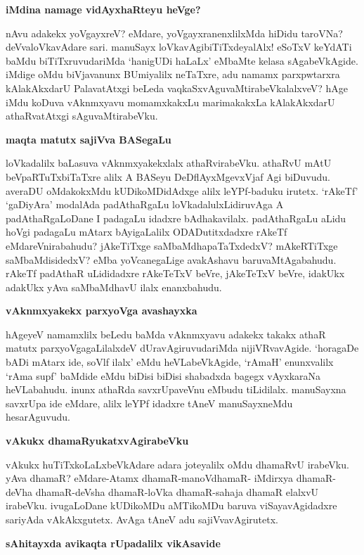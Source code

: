 {\bigskip
\noindent
{\large\bf iMdina namage vidAyxhaRteyu heVge?}}\label{page109}
\medskip

\noindent
nAvu adakekx yoVgayxreV? eMdare, yoVgayxranenxlilxMda hiDidu taroVNa? 
deVvaloVkavAdare sari. manuSayx loVkavAgibiTiTxdeyalAlx! eSoTxV keYdATi baMdu biTiTxruvudariMda `hanigUDi haLaLx' eMbaMte kelasa sAgabeVkAgide. iMdige oMdu biVjavanunx BUmiyalilx neTaTxre, adu namamx parxpwtarxra kAlakAkx\-darU PalavatAtxgi beLeda vaqkaSxvAguvaMtirabeVkalalxveV? hAge iMdu koDuva vAknmxyavu momamxkakxLu mari\-makakxLa kAlakAkxdarU athaRvatAtxgi sAguvaMtirabeVku.

{\bigskip
\noindent
{\large\bf maqta matutx sajiVva BASegaLu}}\label{page109}
\medskip

\noindent
loVkadalilx baLasuva vAknmxyakekxlalx athaRvirabeVku. athaRvU mAtU 
beVpaRTuTxbiTaTxre alilx A BASeyu DeDflAyxMgevxVjaf Agi biDuvudu. 
averaDU oMdakokxMdu kUDikoMDidAdxge alilx leYPf-\-baduku irutetx. `rAkeTf' `gaDiyAra' modalAda padAthaRgaLu loVkadalulxLidiruvAga A padAthaR\-gaLoDane I pada\-gaLu idadxre bAdhakavilalx. padAthaRgaLu aLidu hoVgi padagaLu mAtarx bAyigaLalilx ODADutitxdadxre rAkeTf eMdareVnirabahudu? jAkeTiTxge saMbaMdhapaTaTxdedxV? mAkeRTiTxge saMbaMdisidedxV? eMba yoVcanegaLige avakAshavu baruvaMtAgabahudu. rAkeTf padAthaR uLididadxre rAkeTeTxV beVre, jAkeTeTxV beVre, idakUkx adakUkx yAva saMbaMdhavU ilalx enanxbahudu.

{\bigskip
\noindent
{\large\bf vAknmxyakekx parxyoVga avashayxka}}\label{page110}
\medskip

\noindent
hAgeyeV namamxlilx beLedu baMda vAknmxyavu adakekx takakx athaR matutx parxyoVgagaLilalxdeV dUravAgiru\-vudariMda nijiVRvavAgide. `horagaDe bADi mAtarx ide, soVlf ilalx' eMdu heVLabeVkAgide, `rAmaH' enunxvalilx `rAma supf' baMdide eMdu biDisi biDisi shabadxda bagegx vAyxkaraNa heVLabahudu. inunx\- athaRda savxrUpaveVnu eMbudu tiLidilalx. manuSayxna savxrUpa ide eMdare, alilx leYPf idadxre tAneV manuSayx\-neMdu hesarAguvudu.

{\bigskip
\noindent
{\large\bf vAkukx dhamaRyukatxvAgirabeVku}}\label{page110}
\medskip

\noindent
vAkukx huTiTxkoLaLxbeVkAdare adara joteyalilx oMdu dhamaRvU irabeVku. 
yAva dhamaR? eMdare\--Atamx dhamaR-manoVdhamaR- 
iMdirxya dhamaR-deVha dhamaR-\-deVsha dhamaR-loVka dhamaR-sahaja dhamaR elalxvU irabeVku. ivugaLoDane kUDikoMDu aMTikoMDu baruva viSayavAgidadxre sari\-yAda vAkAkxgutetx. AvAga tAneV adu sajiVvavAgirutetx. 

{\bigskip
\noindent
{\large\bf sAhitayxda avikaqta rUpadalilx vikAsavide}}\label{page110}
\medskip

